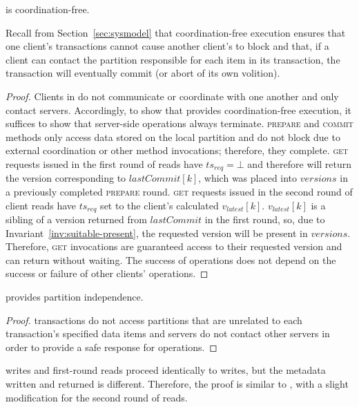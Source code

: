 \begin{claim}\rapl is coordination-free.\end{claim}

Recall from Section~\ref{sec:sysmodel} that coordination-free execution ensures that one client's
transactions cannot cause another client's to block and that, if a
client can contact the partition responsible for each item in its
transaction, the transaction will eventually commit (or abort of its
own volition).

\begin{proof}
Clients in \rapl do not communicate or coordinate with one another and
only contact servers. Accordingly, to show that \rapl provides
coordination-free execution, it suffices to show that server-side
operations always terminate. \textsc{prepare} and \textsc{commit}
methods only access data stored on the local partition and do not
block due to external coordination or other method invocations;
therefore, they complete. \textsc{get} requests issued in the first
round of reads have $ts_{req} = \bot$ and therefore will return the
version corresponding to $lastCommit[k]$, which was placed into
$versions$ in a previously completed \textsc{prepare}
round. \textsc{get} requests issued in the second round of client
reads have $ts_{req}$ set to the client's calculated
$v_{latest}[k]$. $v_{latest}[k]$ is a sibling of a version returned
from $lastCommit$ in the first round, so, due to
Invariant~\ref{inv:suitable-present}, the requested version will be
present in $versions$. Therefore, \textsc{get} invocations are
guaranteed access to their requested version and can return without
waiting. The success of \rapl operations does not depend on the success
or failure of other clients' \rapl operations.
\end{proof}

\begin{claim}\rapl provides partition independence.\end{claim}
\begin{proof}
\rapl transactions do not access partitions that are unrelated to each transaction's
specified data items and servers do not contact other servers in
order to provide a safe response for operations.
\end{proof}

 \raps writes and first-round reads proceed
identically to \rapl writes, but the metadata written and returned is
different. Therefore, the proof is similar to \rapl, with a slight
modification for the second round of reads.

